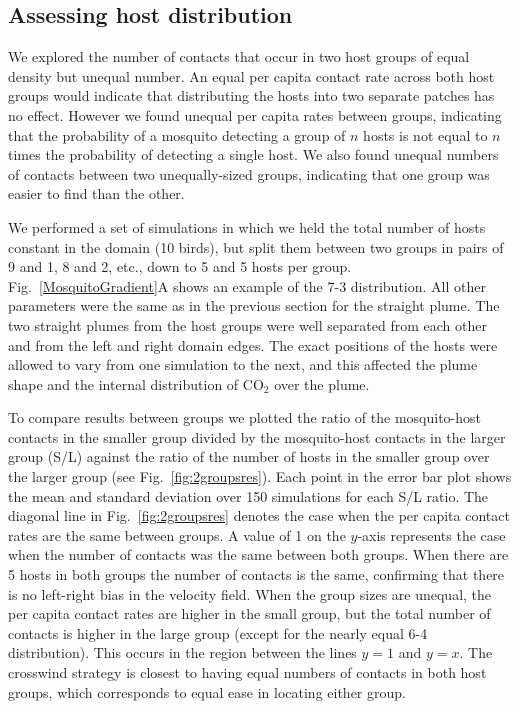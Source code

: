 \documentclass[10pt]{article}
\begin{document}
	
\subsection*{Assessing host distribution}\label{sec:hostdist}
We explored the number of contacts that occur in two host groups of equal density but unequal number. An equal per capita contact rate across both host groups would indicate that distributing the hosts into two separate patches has no effect. However we found unequal per capita rates between groups, indicating that the probability of a mosquito detecting a group of $n$ hosts is not equal to $n$ times the probability of detecting a single host. We also found unequal numbers of contacts between two unequally-sized groups, indicating that one group was easier to find than the other.

We performed a set of simulations in which we held the total number of hosts constant in the domain (10 birds), but split them between two groups in pairs of 9 and 1, 8 and 2, etc., down to 5 and 5 hosts per group.  Fig.~\ref{MosquitoGradient}A shows an example of the 7-3 distribution.
All other parameters were the same as in the previous section for the straight plume.
The two straight plumes from the host groups were well separated from each other and from the left and right domain edges. The exact positions of the hosts were allowed to vary from one simulation to the next, and this affected the plume shape and the internal distribution of CO$_2$ over the plume.

To compare results between groups we plotted
the ratio of the mosquito-host contacts in the smaller group divided by the mosquito-host contacts in the larger group (S/L) against the ratio of the number of hosts in the smaller group over the larger group
(see Fig.~\ref{fig:2groupsres}). Each point in the error bar plot shows the mean and standard deviation over 150 simulations for each S/L ratio. The diagonal line in Fig.~\ref{fig:2groupsres} denotes the case when the per capita contact rates are the same between groups. A value of 1 on the $y$-axis represents the case when the number of contacts was the same between both groups. When there are 5 hosts in both groups the number of contacts is the same, confirming that there is no left-right bias in the velocity field. When the group sizes are unequal, the per capita contact rates are higher in the small group, but the total number of contacts is higher in the large group (except for the nearly equal 6-4 distribution). This occurs in the region between the lines $y=1$ and $y=x$. The crosswind strategy is closest to having equal numbers of contacts in both host groups, which corresponds to equal ease in locating either group.  
\end{document}

